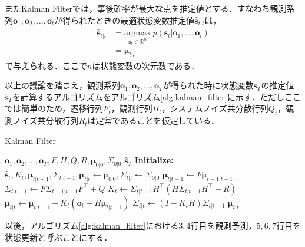         またKalman Filterでは，事後確率が最大な点を推定値とする．すなわち観測系列$\bm{o}_1,\bm{o}_2,\dots,\bm{o}_t$が得られたときの最適状態変数推定値$\hat{\bm{s}}_{t|t}$は，
        \begin{equation}
            \begin{aligned}
                \hat{\bm{s}}_{t|t} &= \underset{\bm{s}_t \in \mathbb{R}^{n}}{\text{argmax}}\ p(\left. \bm{s}_t \right| \bm{o}_1,\dots, \bm{o}_t )
                \\ &= \bm{\mu}_{t|t}
            \end{aligned}
        \end{equation}
        で与えられる．ここで$n$は状態変数の次元数である．
        \par
        以上の議論を踏まえ，観測系列$\bm{o}_1,\bm{o}_2,\dots, \bm{o}_T$が得られた時に状態変数$\bm{s}_T$の推定値$\hat{\bm{s}}_T$を計算するアルゴリズムをアルゴリズム\ref{alg:kalman_filter}に示す．ただしここでは簡単のため，遷移行列$F_t$，観測行列$H_t$，システムノイズ共分散行列$Q_t$，観測ノイズ共分散行列$R_t$は定常であることを仮定している．

        \begin{algorithm}[t]
            \caption{Kalman Filter}
            \label{alg:kalman_filter}
            \begin{algorithmic}[1]
                \REQUIRE $\bm{o}_1,\bm{o}_2,\dots, \bm{o}_T, F, H, Q, R, \bm{\mu}_{0|0}, \Sigma_{0|0}$
                \ENSURE $\hat{\bm{s}}_T$
                \STATE \textbf{Initialize: } $\hat{\bm{s}}_t,K_t, \bm{\mu}_{t|t-1}, \Sigma_{t|t-1}, \bm{\mu}_{t|t} \leftarrow \bm{\mu}_{0|0}, \Sigma_{t|t} \leftarrow \Sigma_{0|0}$
                    \STATE $\bm{\mu}_{t|t-1} \leftarrow F \bm{\mu}_{t-1|t-1}$
                    \STATE $\Sigma_{t|t-1} \leftarrow F \Sigma_{t-1|t-1} F^{\top} + Q$
                    \STATE $K_t \leftarrow \Sigma_{t|t-1} H^{\top} \left(H\Sigma_{t|t-1}H^{\top} + R\right)$
                    \STATE $\bm{\mu}_{t|t} \leftarrow \bm{\mu}_{t|t-1} + K_t \left(\bm{o}_t - H\bm{\mu}_{t|t-1}\right)$
                    \STATE $\Sigma_{t|t} \leftarrow \left(I - K_t H\right) \Sigma_{t|t-1}$
                \ENDFOR
                \RETURN $\bm{\mu}_{t|t}$
            \end{algorithmic}
        \end{algorithm}

        以後，アルゴリズム\ref{alg:kalman_filter}における$3,4$行目を観測予測，$5,6,7$行目を状態更新と呼ぶことにする．

